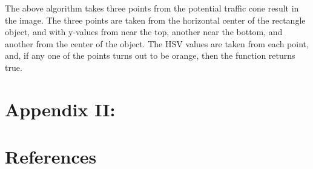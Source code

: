 \documentclass[10pt,letterpaper,onecolumn,draftclsnofoot,journal]{IEEEtran}
\begin{document}
\par
The above algorithm takes three points from the potential traffic cone result in the image. The three points are taken from the horizontal center of the rectangle object, and with y-values from near the top, another near the bottom, and another from the center of the object. The HSV values are taken from each point, and, if any one of the points turns out to be orange, then the function returns true.

\section{\textbf{Appendix II: }}


\section{References}

%
%
\end{document}
